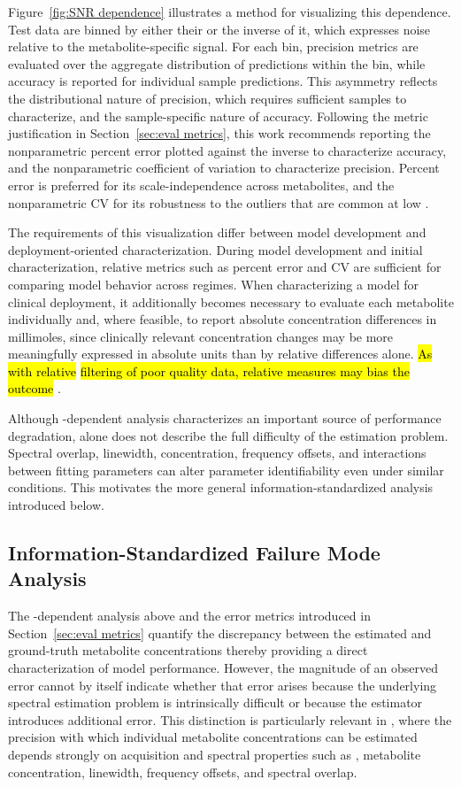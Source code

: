 Figure~\ref{fig:SNR dependence} illustrates a method for visualizing this dependence. Test data are binned by either their \mSNR or the inverse of it, which expresses noise relative to the metabolite-specific signal. For each bin, precision metrics are evaluated over the aggregate distribution of predictions within the bin, while accuracy is reported for individual sample predictions. This asymmetry reflects the distributional nature of precision, which requires sufficient samples to characterize, and the sample-specific nature of accuracy. Following the metric justification in Section~\ref{sec:eval metrics}, this work recommends reporting the nonparametric percent error plotted against the inverse \mSNR to characterize accuracy, and the nonparametric coefficient of variation to characterize precision. Percent error is preferred for its scale-independence across metabolites, and the nonparametric CV for its robustness to the outliers that are common at low \SNR.

The requirements of this visualization differ between model development and deployment-oriented characterization. 
During model development and initial characterization, relative metrics such as percent error and CV are sufficient for comparing model behavior across \SNR regimes. When characterizing a model for clinical deployment, it additionally becomes necessary to evaluate each metabolite individually and, where feasible, to report absolute concentration differences in millimoles, since clinically relevant concentration changes may be more meaningfully expressed in absolute units than by relative differences alone. \hl{As with relative }\CRLB \hl{filtering of poor quality data, relative measures may bias the outcome }\cite{Kreis2016}.

Although \mSNR-dependent analysis characterizes an important source of performance degradation, \mSNR alone does not describe the full difficulty of the estimation problem. Spectral overlap, linewidth, concentration, frequency offsets, and interactions between fitting parameters can alter parameter identifiability even under similar \mSNR conditions. This motivates the more general information-standardized analysis introduced below.

\subsection{Information-Standardized Failure Mode Analysis}
\label{sec:Analy&Visual:subsec:infoStand}
The \mSNR-dependent analysis above and the error metrics introduced in Section~\ref{sec:eval metrics} quantify the discrepancy between the estimated and ground-truth metabolite concentrations thereby providing a direct characterization of model performance. However, the magnitude of an observed error cannot by itself indicate whether that error arises because the underlying spectral estimation problem is intrinsically difficult or because the estimator introduces additional error. This distinction is particularly relevant in \MRS, where the precision with which individual metabolite concentrations can be estimated depends strongly on acquisition and spectral properties such as \SNR, metabolite concentration, linewidth, frequency offsets, and spectral overlap.

